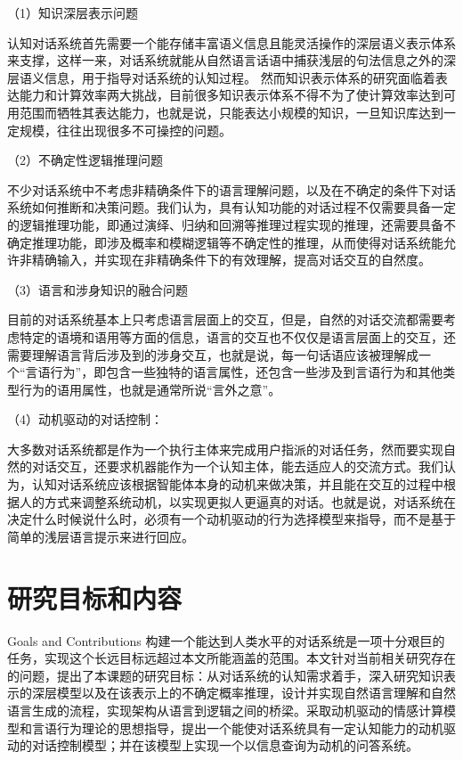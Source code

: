 （1）知识深层表示问题

        认知对话系统首先需要一个能存储丰富语义信息且能灵活操作的深层语义表示体系来支撑，这样一来，对话系统就能从自然语言话语中捕获浅层的句法信息之外的深层语义信息，用于指导对话系统的认知过程。 然而知识表示体系的研究面临着表达能力和计算效率两大挑战，目前很多知识表示体系不得不为了使计算效率达到可用范围而牺牲其表达能力，也就是说，只能表达小规模的知识，一旦知识库达到一定规模，往往出现很多不可操控的问题。

（2）不确定性逻辑推理问题

       不少对话系统中不考虑非精确条件下的语言理解问题，以及在不确定的条件下对话系统如何推断和决策问题。我们认为，具有认知功能的对话过程不仅需要具备一定的逻辑推理功能，即通过演绎、归纳和回溯等推理过程实现的推理，还需要具备不确定推理功能，即涉及概率和模糊逻辑等不确定性的推理，从而使得对话系统能允许非精确输入，并实现在非精确条件下的有效理解，提高对话交互的自然度。

（3）语言和涉身知识的融合问题

       目前的对话系统基本上只考虑语言层面上的交互，但是，自然的对话交流都需要考虑特定的语境和语用等方面的信息，语言的交互也不仅仅是语言层面上的交互，还需要理解语言背后涉及到的涉身交互，也就是说，每一句话语应该被理解成一个“言语行为”，即包含一些独特的语言属性，还包含一些涉及到言语行为和其他类型行为的语用属性，也就是通常所说“言外之意”。

（4）动机驱动的对话控制：

     大多数对话系统都是作为一个执行主体来完成用户指派的对话任务，然而要实现自然的对话交互，还要求机器能作为一个认知主体，能去适应人的交流方式。我们认为，认知对话系统应该根据智能体本身的动机来做决策，并且能在交互的过程中根据人的方式来调整系统动机，以实现更拟人更逼真的对话。也就是说，对话系统在决定什么时候说什么时，必须有一个动机驱动的行为选择模型来指导，而不是基于简单的浅层语言提示来进行回应。


\section{研究目标和内容}{Goals and Contributions}
      构建一个能达到人类水平的对话系统是一项十分艰巨的任务，实现这个长远目标远超过本文所能涵盖的范围。本文针对当前相关研究存在的问题，提出了本课题的研究目标：从对话系统的认知需求着手，深入研究知识表示的深层模型以及在该表示上的不确定概率推理，设计并实现自然语言理解和自然语言生成的流程，实现架构从语言到逻辑之间的桥梁。采取动机驱动的情感计算模型和言语行为理论的思想指导，提出一个能使对话系统具有一定认知能力的动机驱动的对话控制模型；并在该模型上实现一个以信息查询为动机的问答系统。


